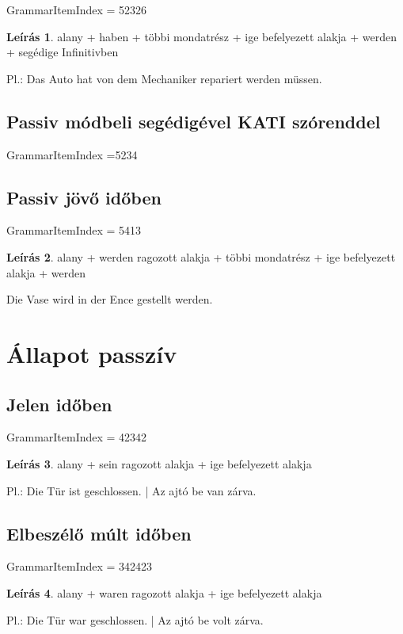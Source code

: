 \documentclass{article}
\theoremstyle{definition}
\newtheorem*{desc}{Leírás}
\begin{document}
GrammarItemIndex = 52326

\begin{desc}
alany + haben + többi mondatrész + ige befelyezett alakja + werden + segédige Infinitivben

Pl.: Das Auto hat von dem Mechaniker repariert werden müssen.
\end{desc}

\subsection{Passiv módbeli segédigével KATI szórenddel}

GrammarItemIndex =5234

\subsection{Passiv jövő időben}

GrammarItemIndex = 5413

\begin{desc}
alany + werden ragozott alakja + többi mondatrész + ige befelyezett alakja + werden

Die Vase wird in der Ence gestellt werden.
\end{desc}

\section{Állapot passzív}

\subsection{Jelen időben}

GrammarItemIndex = 42342

\begin{desc}
alany + sein ragozott alakja + ige befelyezett alakja

Pl.: Die Tür ist geschlossen. | Az ajtó be van zárva.
\end{desc}

\subsection{Elbeszélő múlt időben}

GrammarItemIndex = 342423

\begin{desc}
alany + waren ragozott alakja + ige befelyezett alakja

Pl.: Die Tür war geschlossen. | Az ajtó be volt zárva.
\end{desc}
\end{document}

